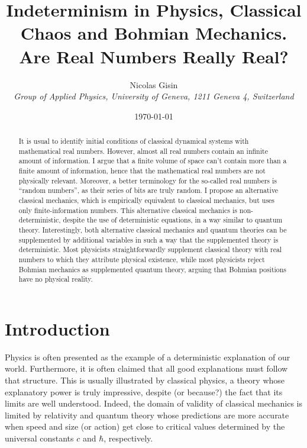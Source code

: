 \documentclass[pra,aps,groupedaddress,twocolumn,floatfix,nofootinbib]{revtex4}
\begin{document}
\title{Indeterminism in Physics, Classical Chaos and Bohmian Mechanics.\\ Are Real Numbers Really Real?}
\author{Nicolas Gisin \\
\it \small   Group of Applied Physics, University of Geneva, 1211 Geneva 4,    Switzerland}

\date{\small \today}
\begin{abstract}
It is usual to identify initial conditions of classical dynamical systems with mathematical real numbers. However, almost all real numbers contain an infinite amount of information. I argue that a finite volume of space can't contain more than a finite amount of information, hence that the mathematical real numbers are not physically relevant. Moreover, a better terminology for the so-called real numbers is ``random numbers'', as their series of bits are truly random. I propose an alternative classical mechanics, which is empirically equivalent to classical mechanics, but uses only finite-information numbers. This alternative classical mechanics is non-deterministic, despite the use of deterministic equations, in a way similar to quantum theory. Interestingly, both alternative classical mechanics and quantum theories can be supplemented by additional variables in such a way that the supplemented theory is deterministic. Most physicists straightforwardly supplement classical theory with real numbers to which they attribute physical existence, while most physicists reject Bohmian mechanics as supplemented quantum theory, arguing that Bohmian positions have no physical reality. 
\end{abstract}
\maketitle



\section{Introduction}\label{intro}
Physics is often presented as the example of a deterministic explanation of our world. Furthermore, it is often claimed that all good explanations must follow that structure. This is usually illustrated by classical physics, a theory whose explanatory power is truly impressive, despite (or because?) the fact that its limits are well understood. Indeed, the domain of validity of classical mechanics is limited by relativity and quantum theory whose predictions are more accurate when speed and size (or action) get close to critical values determined by the universal constants $c$ and $\hbar$, respectively. 
\end{document}
